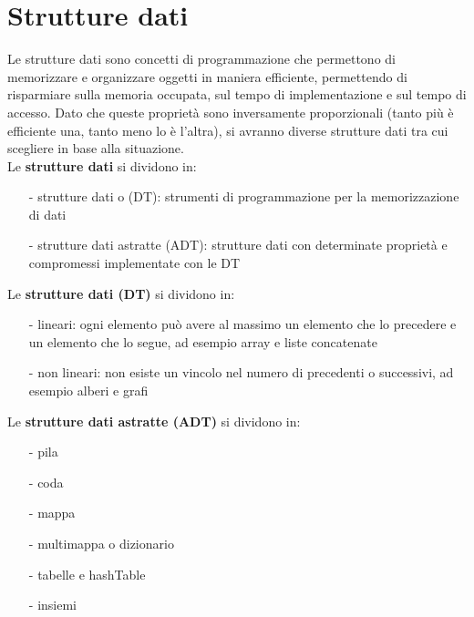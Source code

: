 \documentclass[a4paper]{article}
\begin{document}
\section{Strutture dati}
Le strutture dati sono concetti di programmazione che permettono di memorizzare e organizzare oggetti in maniera efficiente,
permettendo di risparmiare sulla memoria occupata, sul tempo di implementazione e sul tempo di accesso. Dato che queste
proprietà sono inversamente proporzionali (tanto più è efficiente una, tanto meno lo è l'altra), si avranno diverse strutture
dati tra cui scegliere in base alla situazione. \\
Le \textbf{strutture dati} si dividono in:
\begin{itemize} [topsep=3pt, itemsep=0pt]
	\item[-] strutture dati o (DT): strumenti di programmazione per la memorizzazione di dati
	\item[-] strutture dati astratte (ADT): strutture dati con determinate proprietà e compromessi implementate con le DT
\end{itemize}
Le \textbf{strutture dati (DT)} si dividono in:
\begin{itemize} [topsep=3pt, itemsep=0pt]
	\item[-] lineari: ogni elemento può avere al massimo un elemento che lo precedere e un elemento che lo segue, ad esempio
	array e liste concatenate
	\item[-] non lineari: non esiste un vincolo nel numero di precedenti o successivi, ad esempio alberi e grafi
\end{itemize}
Le \textbf{strutture dati astratte (ADT)} si dividono in:
\begin{itemize} [topsep=3pt, itemsep=0pt]
	\item[-] pila
	\item[-] coda
	\item[-] mappa
	\item[-] multimappa o dizionario
	\item[-] tabelle e hashTable
	\item[-] insiemi
\end{itemize}

\end{document}
